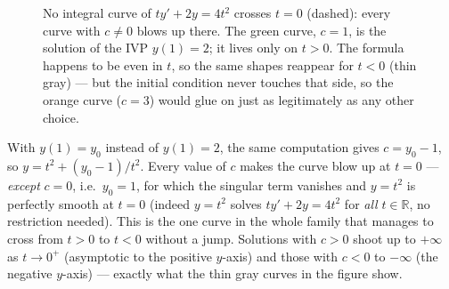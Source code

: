 \begin{figure}[H]
	\centering
	\caption{No integral curve of \(ty' + 2y = 4t^2\) crosses \(t = 0\) (dashed): every
		curve with \(c \neq 0\) blows up there. The green curve, \(c = 1\), is the solution
		of the IVP \(y(1) = 2\); it lives only on \(t > 0\). The formula happens to be even
		in \(t\), so the same shapes reappear for \(t < 0\) (thin gray) --- but the initial
		condition never touches that side, so the orange curve (\(c = 3\)) would glue on
		just as legitimately as any other choice.}
\end{figure}

\begin{observation}
	With \(y(1) = y_0\) instead of \(y(1)=2\), the same computation gives
	\(c = y_0 - 1\), so \(y = t^2 + (y_0-1)/t^2\). Every value of \(c\) makes the curve
	blow up at \(t=0\) --- \emph{except} \(c = 0\), i.e.\ \(y_0 = 1\), for which the
	singular term vanishes and \(y = t^2\) is perfectly smooth at \(t = 0\) (indeed
	\(y=t^2\) solves \(ty'+2y=4t^2\) for \emph{all} \(t \in \mathbb{R}\), no restriction
	needed). This is the one curve in the whole family that manages to cross from
	\(t>0\) to \(t<0\) without a jump. Solutions with \(c > 0\) shoot up to \(+\infty\)
	as \(t \to 0^{+}\) (asymptotic to the positive \(y\)-axis) and those with \(c<0\) to
	\(-\infty\) (the negative \(y\)-axis) --- exactly what the thin gray curves in the
	figure show.
\end{observation}

